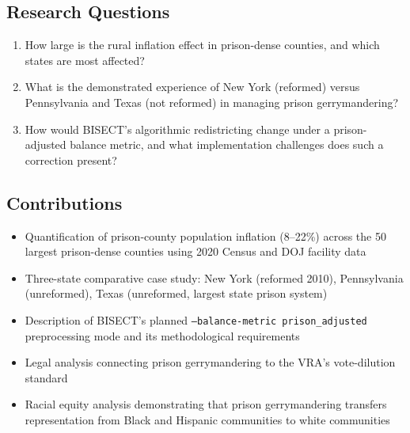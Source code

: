 \subsection{Research Questions}

\begin{enumerate}
    \item How large is the rural inflation effect in prison-dense counties, and which states are most affected?
    \item What is the demonstrated experience of New York (reformed) versus Pennsylvania and Texas (not reformed) in managing prison gerrymandering?
    \item How would BISECT's algorithmic redistricting change under a prison-adjusted balance metric, and what implementation challenges does such a correction present?
\end{enumerate}

\subsection{Contributions}

\begin{itemize}
    \item Quantification of prison-county population inflation (8--22\%) across the 50 largest prison-dense counties using 2020 Census and DOJ facility data
    \item Three-state comparative case study: New York (reformed 2010), Pennsylvania (unreformed), Texas (unreformed, largest state prison system)
    \item Description of BISECT's planned \texttt{--balance-metric prison\_adjusted} preprocessing mode and its methodological requirements
    \item Legal analysis connecting prison gerrymandering to the VRA's vote-dilution standard
    \item Racial equity analysis demonstrating that prison gerrymandering transfers representation from Black and Hispanic communities to white communities
\end{itemize}
